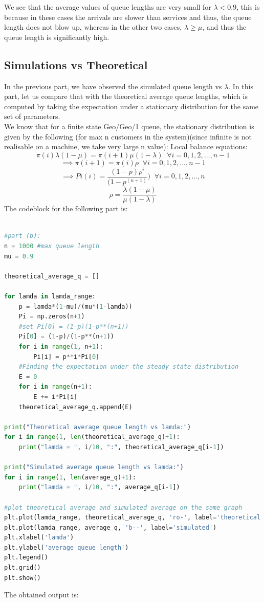 \documentclass[11pt, a4paper]{article}
\begin{document}
We see that the average values of queue lengths are very small for $\lambda < 0.9$, this is because in these cases the arrivals are slower than services and thus, the queue length does not blow up, whereas in the other two cases, $\lambda \ge \mu$, and thus the queue length is significantly high.

\subsection{Simulations vs Theoretical}
In the previous part, we have observed the simulated queue length vs $\lambda$. In this part, let us compare that with the theoretical average queue lengths, which is computed by taking the expectation under a stationary distribution for the same set of parameters. 
\\
We know that for a finite state Geo/Geo/1 queue, the stationary distribution is given by the following (for max n customers in the system)(since infinite is not realisable on a machine, we take very large n value):
Local balance equations:
\[\pi(i)\lambda(1-\mu) = \pi(i+1)\mu(1-\lambda) \;\; \forall i = 0,1,2,\ldots,n-1\]
\[\implies \pi(i+1) = \pi(i)\rho \;\; \forall i = 0,1,2,...,n-1\]
\[\implies Pi(i) = \frac{(1-p)\rho^i}{(1-p^{(n+1)}}) \;\; \forall i = 0,1,2,...,n
\]
\[\rho = \frac{\lambda(1-\mu)}{\mu(1-\lambda)}\]
The codeblock for the following part is:
\begin{lstlisting}[language = Python]

#part (b):
n = 1000 #max queue length
mu = 0.9

theoretical_average_q = []

for lamda in lamda_range:
    p = lamda*(1-mu)/(mu*(1-lamda))
    Pi = np.zeros(n+1)
    #set Pi[0] = (1-p)(1-p**(n+1))
    Pi[0] = (1-p)/(1-p**(n+1))
    for i in range(1, n+1):
        Pi[i] = p**i*Pi[0]
    #Finding the expectation under the steady state distribution
    E = 0
    for i in range(n+1):
        E += i*Pi[i]
    theoretical_average_q.append(E)

print("Theoretical average queue length vs lamda:")
for i in range(1, len(theoretical_average_q)+1):
    print("lamda = ", i/10, ":", theoretical_average_q[i-1])

print("Simulated average queue length vs lamda:")
for i in range(1, len(average_q)+1):
    print("lamda = ", i/10, ":", average_q[i-1])

#plot theoretical average and simulated average on the same graph
plt.plot(lamda_range, theoretical_average_q, 'ro-', label='theoretical')
plt.plot(lamda_range, average_q, 'b--', label='simulated')
plt.xlabel('lamda')
plt.ylabel('average queue length')
plt.legend()
plt.grid()
plt.show()

\end{lstlisting}
The obtained output is:
\end{document}
